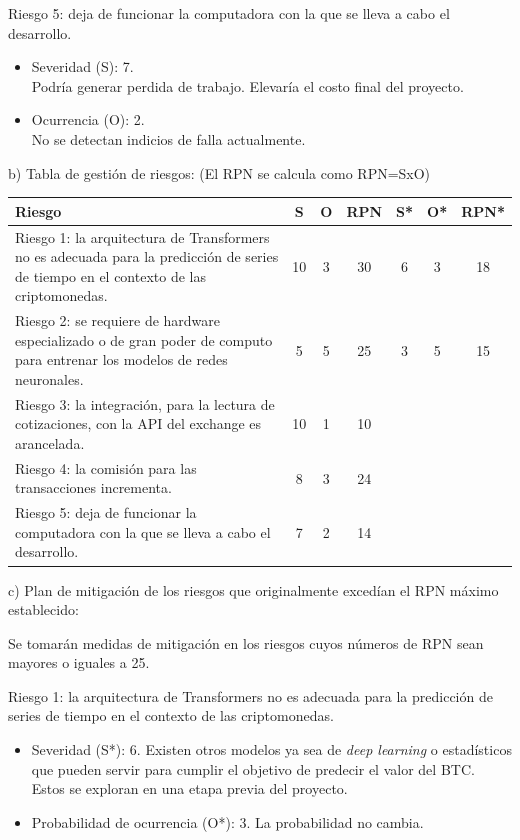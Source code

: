 \documentclass[
    11pt, %
]{charter}
\begin{document}
        Riesgo 5: deja de funcionar la computadora con la que se lleva a cabo el desarrollo.
        \begin{itemize}
        \item Severidad (S): 7.\\
          Podría generar perdida de trabajo. Elevaría el costo final del proyecto.
        \item Ocurrencia (O): 2.\\
          No se detectan indicios de falla actualmente.
        \end{itemize}
        b) Tabla de gestión de riesgos:      (El RPN se calcula como RPN=SxO)


        \begin{table}[htpb]
            \centering
            \begin{tabularx}{\linewidth}{@{}|X|c|c|c|c|c|c|@{}}
                \hline
                \rowcolor[HTML]{C0C0C0}
                Riesgo & S & O & RPN & S* & O* & RPN* \\ \hline
                Riesgo 1: la arquitectura de Transformers no es adecuada para la predicción de series de tiempo en el contexto de las criptomonedas. & 10  & 3  & 30     &  6  & 3   &    18  \\ \hline
                Riesgo 2: se requiere de hardware especializado o de gran poder de computo para entrenar los modelos de redes neuronales. & 5  & 5  &  25   &  3  & 5   & 15     \\ \hline
                Riesgo 3: la integración, para la lectura de cotizaciones, con la API del exchange es arancelada.  & 10  & 1  &  10   &    &    &      \\ \hline
                Riesgo 4: la comisión para las transacciones incrementa. & 8  & 3  &  24   &    &    &      \\ \hline
                Riesgo 5: deja de funcionar la computadora con la que se lleva a cabo el desarrollo. & 7  & 2  &  14   &    &    &      \\ \hline
            \end{tabularx}%
        \end{table}
        c) Plan de mitigación de los riesgos que originalmente excedían el RPN máximo establecido:


     Se tomarán medidas de mitigación en los riesgos cuyos números de RPN sean mayores o iguales a 25.


        Riesgo 1: la arquitectura de Transformers no es adecuada para la predicción de series de tiempo en el contexto de las criptomonedas.
        \begin{itemize}
        \item Severidad (S*): 6.
          Existen otros modelos ya sea de \textit{deep learning} o estadísticos que pueden servir para cumplir el objetivo de predecir el valor del BTC. Estos se exploran en una etapa previa del proyecto.
        \item Probabilidad de ocurrencia (O*): 3.
          La probabilidad no cambia.
        \end{itemize}
\end{document}
